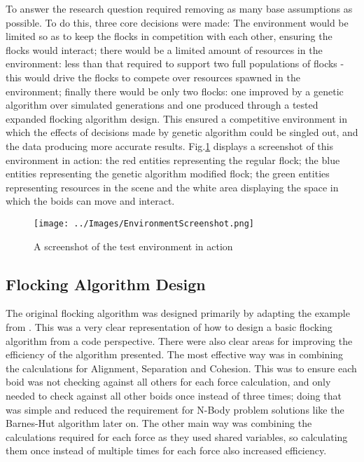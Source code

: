 To answer the research question required removing as many base assumptions as possible. To do this, three core decisions were made: The environment would be limited so as to keep the flocks in competition with each other, ensuring the flocks would interact; there would be a limited amount of resources in the environment: less than that required to support two full populations of flocks - this would drive the flocks to compete over resources spawned in the environment; finally there would be only two flocks: one improved by a genetic algorithm over simulated generations and one produced through a tested expanded flocking algorithm design. This ensured a competitive environment in which the effects of decisions made by genetic algorithm could be singled out, and the data producing more accurate results. Fig.\ref{fig:EnvScrnshot} displays a screenshot of this environment in action: the red entities representing the regular flock; the blue entities representing the genetic algorithm modified flock; the green entities representing resources in the scene and the white area displaying the space in which the boids can move and interact.
\begin{figure}
	\texttt{[image: ../Images/EnvironmentScreenshot.png]}
	\caption{A screenshot of the test environment in action}
	\label{fig:EnvScrnshot}
\end{figure}


\subsection{Flocking Algorithm Design}
The original flocking algorithm was designed primarily by adapting the example from \citet{flockingprocessingorg}. This was a very clear representation of how to design a basic flocking algorithm from a code perspective. There were also clear areas for improving the efficiency of the algorithm presented. The most effective way was in combining the calculations for Alignment, Separation and Cohesion. This was to ensure each boid was not checking against all others for each force calculation, and only needed to check against all other boids once instead of three times; doing that was simple and reduced the requirement for N-Body problem solutions like the Barnes-Hut algorithm later on. The other main way was combining the calculations required for each force as they used shared variables, so calculating them once instead of multiple times for each force also increased efficiency.

